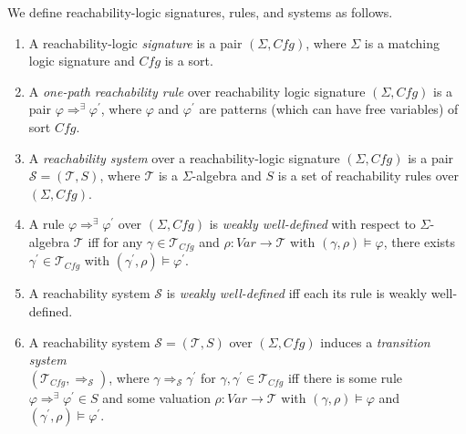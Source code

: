\documentclass{article}
\newcommand{\Var}{\mathit{Var}}
\newcommand{\Tcfg}{\mathcal{T}_{\mathit{Cfg}}}
\begin{document}
\begin{definition}
We define reachability-logic signatures, rules, and systems as follows.
\begin{enumerate}
    \item A reachability-logic \emph{signature} is a pair $(\Sigma, \mathit{Cfg})$,
          where $\Sigma$ is a matching logic signature and $\mathit{Cfg}$ is a sort.
          
    \item A \emph{one-path reachability rule} over reachability logic signature $(\Sigma, \mathit{Cfg})$        is a pair $\varphi \Rightarrow^\exists \varphi^\prime$,
          where $\varphi$ and $\varphi^\prime$
          are patterns (which can have free variables) of sort $\mathit{Cfg}$.
          
    \item A \emph{reachability system} over a reachability-logic signature $(\Sigma, \mathit{Cfg})$
          is a pair $\mathcal{S} = (\mathcal{T}, S)$, where $\mathcal{T}$ is a $\Sigma$-algebra
          and $S$ is a set of reachability rules over $(\Sigma, \mathit{Cfg})$.
          
    \item A rule $\varphi \Rightarrow^\exists \varphi^\prime$ over $(\Sigma, \mathit{Cfg})$
          is \emph{weakly well-defined}
          with respect to $\Sigma$-algebra $\mathcal{T}$
          iff
          for any $\gamma \in \Tcfg$ and $\rho : \Var \to \mathcal{T}$
          with $(\gamma, \rho) \vDash \varphi$,
          there exists $\gamma^\prime \in \Tcfg$ with $(\gamma^\prime , \rho) \vDash \varphi^\prime$.
          
    \item A reachability system $\mathcal{S}$ is \emph{weakly well-defined} iff each its rule is weakly     
          well-defined.
          
    \item A reachability system $\mathcal{S} = (\mathcal{T}, S)$ over $(\Sigma, \mathit{Cfg})$ induces
          a \emph{transition system} \\
          $(\Tcfg , \Rightarrow_{\mathcal{S}})$,
          where $\gamma \Rightarrow_{\mathcal{S}} \gamma^\prime$
          for $\gamma, \gamma^\prime \in \Tcfg$
          iff there is some rule \\ $\varphi \Rightarrow^\exists \varphi^\prime \in S$
          and some valuation $\rho : \Var \to \mathcal{T}$ with $(\gamma, \rho) \vDash \varphi$
          and $(\gamma^\prime , \rho) \vDash \varphi^\prime$.
          

\end{enumerate}
\end{definition}
\end{document}
